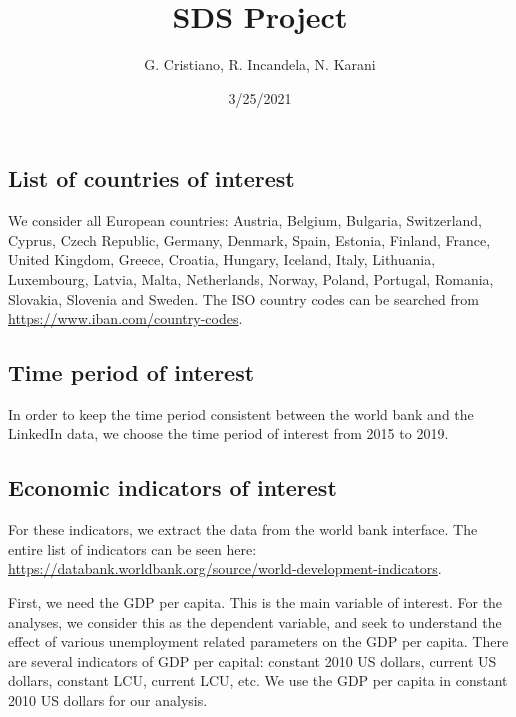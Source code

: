 \documentclass[
]{article}
\title{SDS Project}
\author{G. Cristiano, R. Incandela, N. Karani}
\date{3/25/2021}
\begin{document}
\maketitle

\fontsize{11}{14}
\selectfont

\hypertarget{list-of-countries-of-interest}{%
\subsection{List of countries of
interest}\label{list-of-countries-of-interest}}

We consider all European countries: Austria, Belgium, Bulgaria,
Switzerland, Cyprus, Czech Republic, Germany, Denmark, Spain, Estonia,
Finland, France, United Kingdom, Greece, Croatia, Hungary, Iceland,
Italy, Lithuania, Luxembourg, Latvia, Malta, Netherlands, Norway,
Poland, Portugal, Romania, Slovakia, Slovenia and Sweden. The ISO
country codes can be searched from
\url{https://www.iban.com/country-codes}.

\hypertarget{time-period-of-interest}{%
\subsection{Time period of interest}\label{time-period-of-interest}}

In order to keep the time period consistent between the world bank and
the LinkedIn data, we choose the time period of interest from 2015 to
2019.

\hypertarget{economic-indicators-of-interest}{%
\subsection{Economic indicators of
interest}\label{economic-indicators-of-interest}}

For these indicators, we extract the data from the world bank interface.
The entire list of indicators can be seen here:
\url{https://databank.worldbank.org/source/world-development-indicators}.

First, we need the GDP per capita. This is the main variable of
interest. For the analyses, we consider this as the dependent variable,
and seek to understand the effect of various unemployment related
parameters on the GDP per capita. There are several indicators of GDP
per capital: constant 2010 US dollars, current US dollars, constant LCU,
current LCU, etc. We use the GDP per capita in constant 2010 US dollars
for our analysis.
\end{document}
